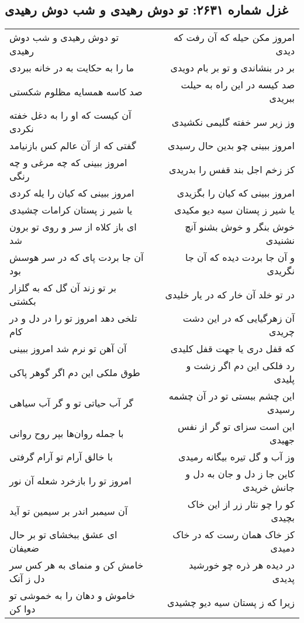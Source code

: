 \begin{center}
\section*{غزل شماره ۲۶۳۱: تو دوش رهیدی و شب دوش رهیدی}
\label{sec:2631}
\begin{longtable}{l p{0.5cm} r}
تو دوش رهیدی و شب دوش رهیدی
&&
امروز مکن حیله که آن رفت که دیدی
\\
ما را به حکایت به در خانه ببردی
&&
بر در بنشاندی و تو بر بام دویدی
\\
صد کاسه همسایه مظلوم شکستی
&&
صد کیسه در این راه به حیلت ببریدی
\\
آن کیست که او را به دغل خفته نکردی
&&
وز زیر سر خفته گلیمی نکشیدی
\\
گفتی که از آن عالم کس بازنیامد
&&
امروز ببینی چو بدین حال رسیدی
\\
امروز ببینی که چه مرغی و چه رنگی
&&
کز زخم اجل بند قفس را بدریدی
\\
امروز ببینی که کیان را یله کردی
&&
امروز ببینی که کیان را بگزیدی
\\
یا شیر ز پستان کرامات چشیدی
&&
یا شیر ز پستان سیه دیو مکیدی
\\
ای باز کلاه از سر و روی تو برون شد
&&
خوش بنگر و خوش بشنو آنچ نشنیدی
\\
آن جا بردت پای که در سر هوسش بود
&&
و آن جا بردت دیده که آن جا نگریدی
\\
بر تو زند آن گل که به گلزار بکشتی
&&
در تو خلد آن خار که در یار خلیدی
\\
تلخی دهد امروز تو را در دل و در کام
&&
آن زهرگیایی که در این دشت چریدی
\\
آن آهن تو نرم شد امروز ببینی
&&
که قفل دری یا جهت قفل کلیدی
\\
طوق ملکی این دم اگر گوهر پاکی
&&
رد فلکی این دم اگر زشت و پلیدی
\\
گر آب حیاتی تو و گر آب سیاهی
&&
این چشم ببستی تو در آن چشمه رسیدی
\\
با جمله روان‌ها بپر روح روانی
&&
این است سزای تو گر از نفس جهیدی
\\
با خالق آرام تو آرام گرفتی
&&
وز آب و گل تیره بیگانه رمیدی
\\
امروز تو را بازخرد شعله آن نور
&&
کاین جا ز دل و جان به دل و جانش خریدی
\\
آن سیمبر اندر بر سیمین تو آید
&&
کو را چو نثار زر از این خاک بچیدی
\\
ای عشق ببخشای تو بر حال ضعیفان
&&
کز خاک همان رست که در خاک دمیدی
\\
خامش کن و منمای به هر کس سر دل ز آنک
&&
در دیده هر ذره چو خورشید پدیدی
\\
خاموش و دهان را به خموشی تو دوا کن
&&
زیرا که ز پستان سیه دیو چشیدی
\\
\end{longtable}
\end{center}
